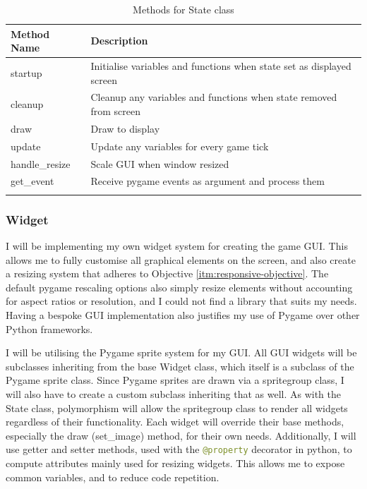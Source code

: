 \documentclass[../main/main.tex]{subfiles}
\begin{document}
\begin{longtable}[c]{l|l}
    \toprule
    \textbf{Method Name} & \textbf{Description}\\
    \midrule
    \endfirsthead
    \endhead

    startup & Initialise variables and functions when state set as displayed screen\\
    cleanup & Cleanup any variables and functions when state removed from screen\\
    draw & Draw to display\\
    update & Update any variables for every game tick\\
    handle\_resize & Scale GUI when window resized\\
    get\_event & Receive pygame events as argument and process them\\

    \bottomrule
    
\caption{Methods for State class}
\label{tab:state-methods}
\end{longtable}

\subsubsection*{Widget}
I will be implementing my own widget system for creating the game GUI. This allows me to fully customise all graphical elements on the screen, and also create a resizing system that adheres to Objective \ref{itm:responsive-objective}. The default pygame rescaling options also simply resize elements without accounting for aspect ratios or resolution, and I could not find a library that suits my needs. Having a bespoke GUI implementation also justifies my use of Pygame over other Python frameworks.

I will be utilising the Pygame sprite system for my GUI. All GUI widgets will be subclasses inheriting from the base Widget class, which itself is a subclass of the Pygame sprite class.
Since Pygame sprites are drawn via a spritegroup class, I will also have to create a custom subclass inheriting that as well. As with the State class, polymorphism will allow the spritegroup class to render all widgets regardless of their functionality. Each widget will override their base methods, especially the draw (set\_image) method, for their own needs. Additionally, I will use getter and setter methods, used with the \lstinline[language=Python]{@property} decorator in python, to compute attributes mainly used for resizing widgets. This allows me to expose common variables, and to reduce code repetition.
\end{document}
